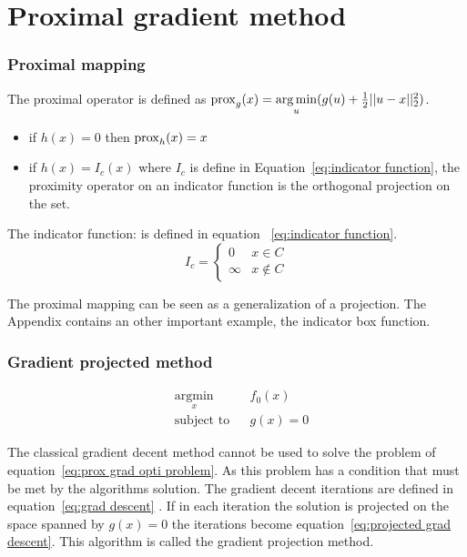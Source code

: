 \chapter{Proximal gradient method}
	\subsection{Proximal mapping}
		The proximal operator is defined as $\operatorname{prox}_g(x)= \underset{u}{\operatorname*{arg\,min}}(g(u) + \frac{1}{2}||u-x||^2_2)$. 
		
		\begin{itemize}
			\item if $h(x)=0$ then $\operatorname{prox}_h(x)=x$ 
			\item if $h(x)=I_c(x)$ where $I_c$ is define in Equation~\ref{eq:indicator function}, the proximity operator on an indicator function is the orthogonal projection on the set.
		\end{itemize}
		
		The indicator function: is defined in equation ~\ref{eq:indicator function}.
		\begin{equation}
			I_c = 
			\begin{cases}
			0 & x \in C  \\
			\infty & x \notin C
			\end{cases}
			\label{eq:indicator function}
		\end{equation}
		
		The proximal mapping can be seen as a generalization of a projection. The Appendix contains an other important example, the indicator box function.
	
	\subsection{Gradient projected method}
		
		\begin{equation}
			\begin{aligned}
			& \underset{x}{\text{argmin}}
			& & f_0(x) \\
			& \text{subject to}
			& & g(x)=0
			\end{aligned}
			\label{eq:prox grad opti problem}
		\end{equation}
		
		The classical gradient decent method cannot be used to solve the problem of equation~\ref{eq:prox grad opti problem}. As this problem has a condition that must be met by the algorithms solution. The gradient decent iterations are defined in equation~\ref{eq:grad descent} . If in each iteration the solution is projected on the space spanned by $g(x)=0$ the iterations become equation~\ref{eq:projected grad descent}. This algorithm is called the gradient projection method.
		
